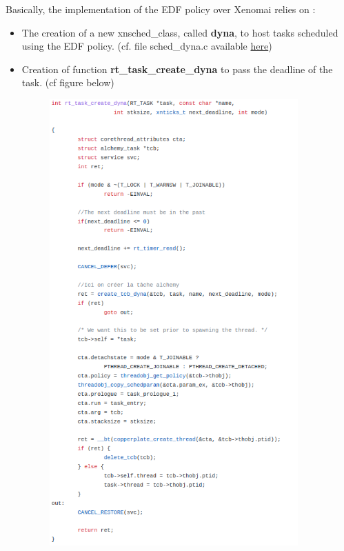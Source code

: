 \documentclass[12pt,hidelinks]{article}
\begin{document}
{    Basically, the implementation of the EDF policy over Xenomai relies on :
    \begin{itemize}
        \item The creation of a new xnsched\_class, called \textbf{dyna}, to host tasks scheduled using the EDF policy. (cf. file sched\_dyna.c available \href{https://github.com/skyultime/Xenomai-EDH/blob/final_version/kernel/cobalt/sched-dyna.c}{here})
        \item Creation of function \textbf{rt\_task\_create\_dyna} to pass the deadline of the task. (cf figure below)


    \begin{figure}[ht]
        \centering
        \begin{minipage}{0.45\textwidth}
            \centering
            \includegraphics[width=0.9\textwidth]{rt_task_create_dyna_func.png} %

\end{minipage}
\end{figure}
\end{itemize}}
\end{document}
